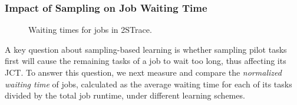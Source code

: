 \subsubsection{Impact of Sampling on Job Waiting Time}
\label{sec:sim:waitingTimes}

\begin{figure}[tp]
\centering
\vspace{-0.2in}
\caption{Waiting times for jobs in 2STrace. }
\label{fig:sim:waitingTimes}
\vspace{-0.1in}
\end{figure}

A key question about sampling-based learning is whether sampling pilot tasks
first will cause the remaining tasks of a job to wait too long, thus affecting
its JCT.  To answer this question, we next measure and compare the {\em
normalized waiting time} of jobs, calculated as the average waiting time for
each of its tasks divided by the total job runtime, under different learning
schemes.


